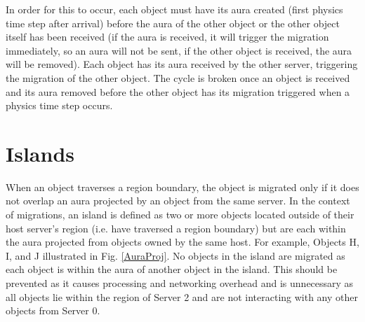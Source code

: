 In order for this to occur, each object must have its aura created (first physics time step after arrival) before the aura of the other object or the other object itself has been received (if the aura is received, it will trigger the migration immediately, so an aura will not be sent, if the other object is received, the aura will be removed). Each object has its aura received by the other server, triggering the migration of the other object. The cycle is broken once an object is received and its aura removed before the other object has its migration triggered when a physics time step occurs.



\section{Islands}
When an object traverses a region boundary, the object is migrated only if it does not overlap an aura projected by an object from the same server. In the context of migrations, an island is defined as two or more objects located outside of their host server's region (i.e. have traversed a region boundary) but are each within the aura projected from objects owned by the same host. For example, Objects H, I, and J illustrated in Fig. \ref{AuraProj}. No objects in the island are migrated as each object is within the aura of another object in the island. This should be prevented as it causes processing and networking overhead and is unnecessary as all objects lie within the region of Server 2 and are not interacting with any other objects from Server 0. 

